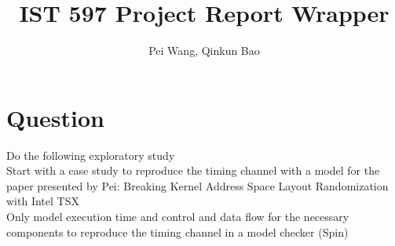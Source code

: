 \documentclass[]{article}
\title{IST 597 Project Report Wrapper}
\author{Pei Wang, Qinkun Bao}
\date{}
\begin{document}
\maketitle

\section*{Question}
Do the following exploratory study\\
Start with a case study to reproduce the timing channel with a model for the paper presented by Pei: Breaking Kernel Address Space Layout Randomization with Intel TSX\\
Only model execution time and control and data flow for the necessary components to reproduce the timing channel in a model checker (Spin)



















\end{document}
